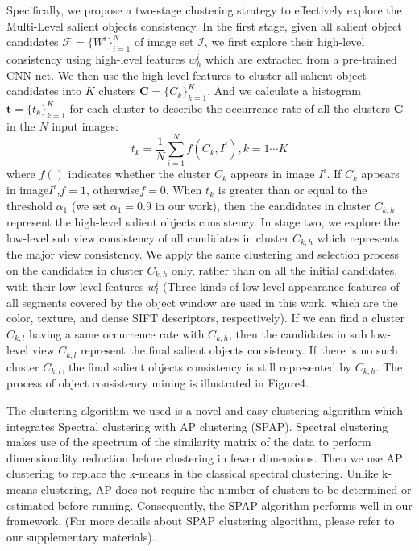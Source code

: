 \documentclass[sigconf]{acmart}
\begin{document}
Specifically, we propose a two-stage clustering strategy to effectively explore the Multi-Level salient objects consistency.
In the first stage, given all salient object candidates $\mathcal{F}=\{ W^{i}\}_{i=1}^{N}$ of image set $\mathcal{I}$, we first explore their high-level consistency  using high-level features $w_{h}^{i}$ which are extracted from a pre-trained CNN net\cite{DBLP:journals/corr/SimonyanZ14a}. We then use the high-level features to cluster all salient object candidates into $K$ clusters $\textbf{C}=\{C_{k}\}_{k=1}^{K}$. And we calculate a histogram $ \textbf{t}=\{t_{k}\}_{k=1}^{K}$ for each cluster to describe the occurrence rate of all the clusters $\textbf{C} $ in the $N$ input images:
\begin{equation}
t_{k}= \frac{1}{N}\sum_{i=1}^{N}f(C_{k},I^{i}),   k=1\cdots K
\end{equation}
where $f()$ indicates whether the cluster $C_{k}$  appears in image $I^{i}$. If $C_{k}$ appears in image$ I^{i}$,$ f=1$, otherwise$ f=0$. When $t_{k}$ is greater than or equal to the threshold $\alpha_{1
}$ (we set $\alpha_{1
}=0.9$ in our work), then the candidates in  cluster $C_{k,h}$ represent the high-level salient objects consistency. In stage two, we explore the low-level sub view consistency of all candidates in cluster $C_{k,h}$ which represents the major view consistency. We apply the same clustering and selection process on the candidates in cluster $C_{k,h}$ only, rather than on all the initial candidates, with their low-level features $w_{l}^{i}$ (Three kinds of low-level appearance features of all segments covered by the object window are used in this work, which are the color, texture, and dense SIFT descriptors\cite{DBLP:journals/pami/LiuYT11}, respectively). If we can find a cluster $C_{k,l}$ having a same occurrence rate with $C_{k,h}$, then the candidates in sub low-level view $C_{k,l}$ represent the final salient objects consistency. If there is no such cluster $C_{k,l}$, the final salient objects consistency is still represented by $C_{k,h}$.  The process of object consistency mining is illustrated in Figure4.

The clustering algorithm we used is a novel and easy clustering algorithm which integrates Spectral clustering with AP clustering \cite{frey2007clustering} (SPAP). 
 Spectral clustering makes use of the spectrum of the similarity matrix of the data to perform dimensionality reduction before clustering in fewer dimensions. Then we use AP clustering to replace the k-means in the classical spectral clustering. Unlike k-means clustering, AP does not require the number of clusters to be determined or estimated before running. Consequently, the SPAP algorithm performs well in our framework.  (For more details about SPAP clustering algorithm, please refer to our supplementary materials).
 
\end{document}
